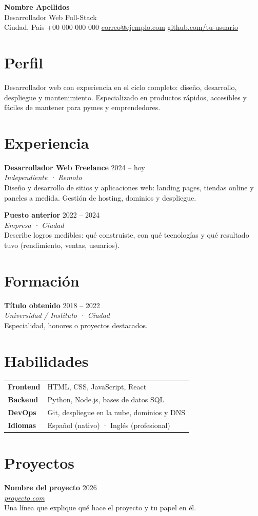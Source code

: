 \documentclass[10.5pt,a4paper]{article}
\newcommand{\entrada}[4]{%
  \textbf{#2} \hfill {\small\color{grissuave}#1}\\
  {\itshape\color{grissuave}#3}\\[1pt]
  #4\par\vspace{0.55em}}
\begin{document}
{\Huge\bfseries\sffamily Nombre Apellidos}\\[3pt]
{\Large\sffamily\color{acento} Desarrollador Web Full-Stack}\\[6pt]
{\small\color{grissuave}
  Ciudad, País \textbullet{} +00 000 000 000 \textbullet{}
  \href{mailto:correo@ejemplo.com}{correo@ejemplo.com} \textbullet{}
  \href{https://github.com/tu-usuario}{github.com/tu-usuario}}

\section{Perfil}
Desarrollador web con experiencia en el ciclo completo: diseño, desarrollo,
despliegue y mantenimiento. Especializado en productos rápidos, accesibles y
fáciles de mantener para pymes y emprendedores.

\section{Experiencia}
\entrada{2024 -- hoy}{Desarrollador Web Freelance}{Independiente · Remoto}{%
Diseño y desarrollo de sitios y aplicaciones web: landing pages, tiendas
online y paneles a medida. Gestión de hosting, dominios y despliegue.}
\entrada{2022 -- 2024}{Puesto anterior}{Empresa · Ciudad}{%
Describe logros medibles: qué construiste, con qué tecnologías y qué
resultado tuvo (rendimiento, ventas, usuarios).}

\section{Formación}
\entrada{2018 -- 2022}{Título obtenido}{Universidad / Instituto · Ciudad}{%
Especialidad, honores o proyectos destacados.}

\section{Habilidades}
\begin{tabular}{@{}p{2.6cm} p{13.5cm}@{}}
  \textbf{Frontend} & HTML, CSS, JavaScript, React\\
  \textbf{Backend}  & Python, Node.js, bases de datos SQL\\
  \textbf{DevOps}   & Git, despliegue en la nube, dominios y DNS\\
  \textbf{Idiomas}  & Español (nativo) · Inglés (profesional)\\
\end{tabular}

\section{Proyectos}
\entrada{2026}{Nombre del proyecto}{\href{https://proyecto.com}{proyecto.com}}{%
Una línea que explique qué hace el proyecto y tu papel en él.}
\end{document}
